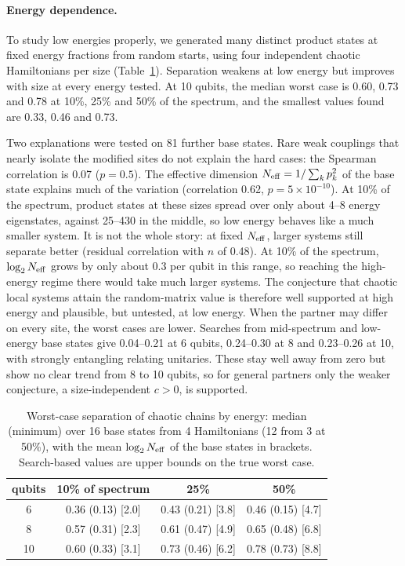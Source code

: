 \documentclass[11pt]{article}
\theoremstyle{definition}
\theoremstyle{remark}
\begin{document}
\paragraph{Energy dependence.} To study low energies properly, we generated many distinct product states at fixed energy fractions from random starts, using four independent chaotic Hamiltonians per size (Table~\ref{tab:energy}).
Separation weakens at low energy but improves with size at every energy tested. At 10 qubits, the median worst case is 0.60, 0.73 and 0.78 at 10\%, 25\% and 50\% of the spectrum, and the smallest values found are 0.33, 0.46 and 0.73.

Two explanations were tested on 81 further base states. Rare weak couplings that nearly isolate the modified sites do not explain the hard cases: the Spearman correlation is 0.07 ($p=0.5$).
The effective dimension $N_{\rm eff}=1/\sum_kp_k^2$ of the base state explains much of the variation (correlation 0.62, $p=5\times10^{-10}$). At 10\% of the spectrum, product states at these sizes spread over only about 4--8 energy eigenstates, against 25--430 in the middle, so low energy behaves like a much smaller system. It is not the whole story: at fixed $N_{\rm eff}$, larger systems still separate better (residual correlation with $n$ of 0.48).
At 10\% of the spectrum, $\log_2N_{\rm eff}$ grows by only about 0.3 per qubit in this range, so reaching the high-energy regime there would take much larger systems. The conjecture that chaotic local systems attain the random-matrix value is therefore well supported at high energy and plausible, but untested, at low energy. When the partner may differ on every site, the worst cases are lower. Searches from mid-spectrum and low-energy base states give 0.04--0.21 at 6 qubits, 0.24--0.30 at 8 and 0.23--0.26 at 10, with strongly entangling relating unitaries. These stay well away from zero but show no clear trend from 8 to 10 qubits, so for general partners only the weaker conjecture, a size-independent $c>0$, is supported.

\begin{table}[h]\centering\small
\begin{tabular}{cccc}
\toprule
qubits & 10\% of spectrum & 25\% & 50\%\\
\midrule
6 & 0.36 (0.13) [2.0] & 0.43 (0.21) [3.8] & 0.46 (0.15) [4.7]\\
8 & 0.57 (0.31) [2.3] & 0.61 (0.47) [4.9] & 0.65 (0.48) [6.8]\\
10 & 0.60 (0.33) [3.1] & 0.73 (0.46) [6.2] & 0.78 (0.73) [8.8]\\
\bottomrule
\end{tabular}
\caption{Worst-case separation of chaotic chains by energy: median (minimum) over 16 base states from 4 Hamiltonians (12 from 3 at 50\%), with the mean $\log_2N_{\rm eff}$ of the base states in brackets. Search-based values are upper bounds on the true worst case.}
\label{tab:energy}
\end{table}
\end{document}
